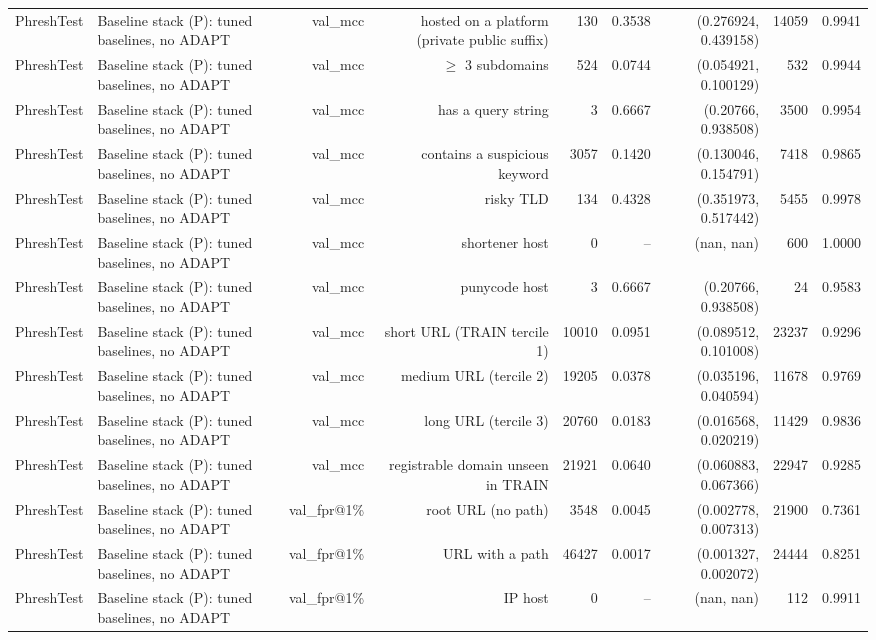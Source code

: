 \begin{table}[t]
\begin{tabular}{llrrrrrrr}
PhreshTest & Baseline stack (P): tuned baselines, no ADAPT & val\_mcc & hosted on a platform (private public suffix) & 130 & 0.3538 & (0.276924, 0.439158) & 14059 & 0.9941 \\
PhreshTest & Baseline stack (P): tuned baselines, no ADAPT & val\_mcc & $\geq$ 3 subdomains & 524 & 0.0744 & (0.054921, 0.100129) & 532 & 0.9944 \\
PhreshTest & Baseline stack (P): tuned baselines, no ADAPT & val\_mcc & has a query string & 3 & 0.6667 & (0.20766, 0.938508) & 3500 & 0.9954 \\
PhreshTest & Baseline stack (P): tuned baselines, no ADAPT & val\_mcc & contains a suspicious keyword & 3057 & 0.1420 & (0.130046, 0.154791) & 7418 & 0.9865 \\
PhreshTest & Baseline stack (P): tuned baselines, no ADAPT & val\_mcc & risky TLD & 134 & 0.4328 & (0.351973, 0.517442) & 5455 & 0.9978 \\
PhreshTest & Baseline stack (P): tuned baselines, no ADAPT & val\_mcc & shortener host & 0 & -- & (nan, nan) & 600 & 1.0000 \\
PhreshTest & Baseline stack (P): tuned baselines, no ADAPT & val\_mcc & punycode host & 3 & 0.6667 & (0.20766, 0.938508) & 24 & 0.9583 \\
PhreshTest & Baseline stack (P): tuned baselines, no ADAPT & val\_mcc & short URL (TRAIN tercile 1) & 10010 & 0.0951 & (0.089512, 0.101008) & 23237 & 0.9296 \\
PhreshTest & Baseline stack (P): tuned baselines, no ADAPT & val\_mcc & medium URL (tercile 2) & 19205 & 0.0378 & (0.035196, 0.040594) & 11678 & 0.9769 \\
PhreshTest & Baseline stack (P): tuned baselines, no ADAPT & val\_mcc & long URL (tercile 3) & 20760 & 0.0183 & (0.016568, 0.020219) & 11429 & 0.9836 \\
PhreshTest & Baseline stack (P): tuned baselines, no ADAPT & val\_mcc & registrable domain unseen in TRAIN & 21921 & 0.0640 & (0.060883, 0.067366) & 22947 & 0.9285 \\
PhreshTest & Baseline stack (P): tuned baselines, no ADAPT & val\_fpr@1\% & root URL (no path) & 3548 & 0.0045 & (0.002778, 0.007313) & 21900 & 0.7361 \\
PhreshTest & Baseline stack (P): tuned baselines, no ADAPT & val\_fpr@1\% & URL with a path & 46427 & 0.0017 & (0.001327, 0.002072) & 24444 & 0.8251 \\
PhreshTest & Baseline stack (P): tuned baselines, no ADAPT & val\_fpr@1\% & IP host & 0 & -- & (nan, nan) & 112 & 0.9911 \\

\end{tabular}
\end{table}
